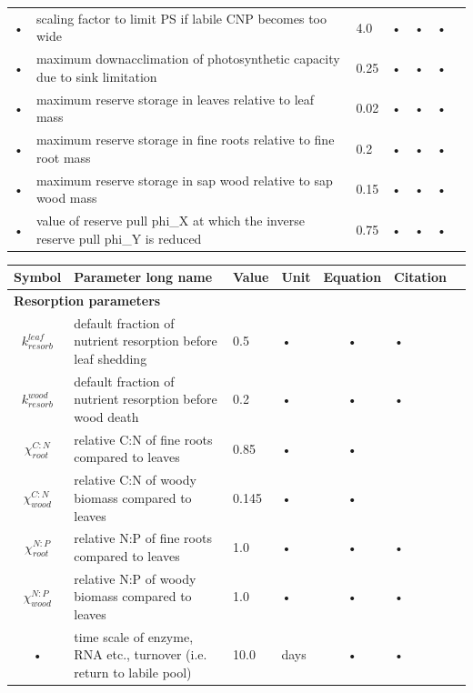 \documentclass[11pt,oneside,openright,a4paper,fleqn]{book}  %
\begin{document}
\begin{table}
\begin{tabularx}{\linewidth}{|c|X|l|l|c|l|c|}
• & scaling factor to limit PS if labile CNP becomes too wide & 4.0 & • & • & • \\
• & maximum downacclimation of photosynthetic capacity due to sink limitation & 0.25 & • & • & • \\
• & maximum reserve storage in leaves relative to leaf mass & 0.02 & • & • & • \\
• & maximum reserve storage in fine roots relative to fine root mass & 0.2 & • & • & • \\
• & maximum reserve storage in sap wood relative to sap wood mass & 0.15 & • & • & • \\
• & value of reserve pull phi\_X at which the inverse reserve pull phi\_Y is reduced & 0.75 & • & • & • \\
\hline 
\end{tabularx}
\end{table}

\begin{table}
\begin{tabularx}{\linewidth}{|c|X|l|l|c|l|c|} %
\hline 
Symbol & Parameter long name & Value & Unit & Equation & Citation \\
\hline 

\multicolumn{6}{l}{\bf Resorption parameters}\\
\hline
$k_{resorb}^{leaf}$ & default fraction of nutrient resorption before leaf shedding & 0.5 & • & • & • \\
$k_{resorb}^{wood}$ & default fraction of nutrient resorption before wood death & 0.2 & • & • & • \\
$\chi_{root}^{C:N}$ & relative C:N of fine roots compared to leaves & 0.85 & • & • & \cite{Zaehle:2010cz} \\
$\chi_{wood}^{C:N}$ & relative C:N of woody biomass compared to leaves & 0.145 & • & • & \cite{Zaehle:2010cz} \\
$\chi_{root}^{N:P}$ & relative N:P of fine roots compared to leaves & 1.0 & • & • & • \\
$\chi_{wood}^{N:P}$ & relative N:P of woody biomass compared to leaves & 1.0 & • & • & • \\
• & time scale of enzyme, RNA etc., turnover (i.e. return to labile pool) & 10.0 & days & • & • \\
\hline 
\end{tabularx}
\end{table}
\end{document}
